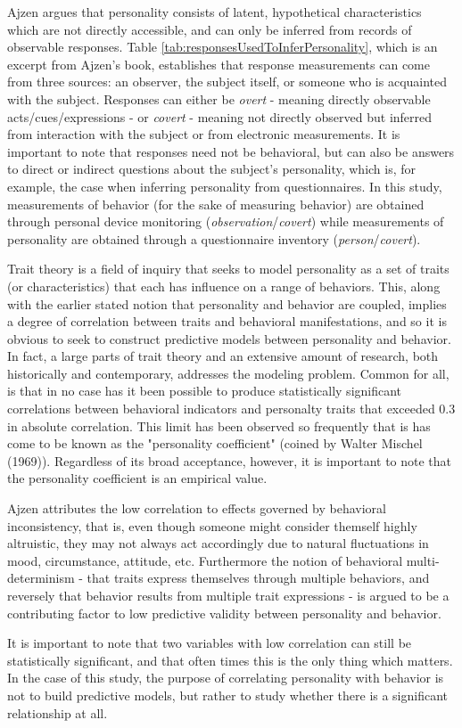 Ajzen argues that personality consists of latent, hypothetical characteristics which are not directly accessible, and can only be inferred from records of observable responses. Table \ref{tab:responsesUsedToInferPersonality}, which is an excerpt from Ajzen's book, establishes that response measurements can come from three sources: an observer, the subject itself, or someone who is acquainted with the subject. Responses can either be \textit{overt} - meaning directly observable acts/cues/expressions - or \textit{covert} - meaning not directly observed but inferred from interaction with the subject or from electronic measurements. It is important to note that responses need not be behavioral, but can also be answers to direct or indirect questions about the subject's personality, which is, for example, the case when inferring personality from questionnaires. In this study, measurements of behavior (for the sake of measuring behavior) are obtained through personal device monitoring (\textit{observation}/\textit{covert}) while measurements of personality are obtained through a questionnaire inventory (\textit{person}/\textit{covert}).

Trait theory is a field of inquiry that seeks to model personality as a set of traits (or characteristics) that each has influence on a range of behaviors. This, along with the earlier stated notion that personality and behavior are coupled, implies a degree of correlation between traits and behavioral manifestations, and so it is obvious to seek to construct predictive models between personality and behavior. In fact, a large parts of trait theory and an extensive amount of research, both historically and contemporary, addresses the modeling problem. Common for all, is that in no case has it been possible to produce statistically significant correlations between behavioral indicators and personalty traits that exceeded 0.3 in absolute correlation. This limit has been observed so frequently that is has come to be known as the "personality coefficient" (coined by Walter Mischel (1969)). Regardless of its broad acceptance, however, it is important to note that the personality coefficient is an empirical value.

Ajzen attributes the low correlation to effects governed by behavioral inconsistency, that is, even though someone might consider themself highly altruistic, they may not always act accordingly due to natural fluctuations in mood, circumstance, attitude, etc. Furthermore the notion of behavioral multi-determinism -  that traits express themselves through multiple behaviors, and reversely that behavior results from multiple trait expressions - is argued to be a contributing factor to low predictive validity between personality and behavior.

It is important to note that two variables with low correlation can still be statistically significant, and that often times this is the only thing which matters. In the case of this study, the purpose of correlating personality with behavior is not to build predictive models, but rather to study whether there is a significant relationship at all.